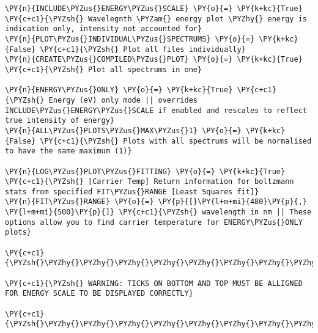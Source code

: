 \begin{tcolorbox}[breakable, size=fbox, boxrule=1pt, pad at break*=1mm,colback=cellbackground, colframe=cellborder]
\begin{Verbatim}[commandchars=\\\{\}]
\PY{n}{INCLUDE\PYZus{}ENERGY\PYZus{}SCALE} \PY{o}{=} \PY{k+kc}{True} \PY{c+c1}{\PYZsh{} Wavelegnth \PYZam{} energy plot \PYZhy{} energy is indication only, intensity not accounted for}
\PY{n}{PLOT\PYZus{}INDIVIDUAL\PYZus{}SPECTRUMS} \PY{o}{=} \PY{k+kc}{False} \PY{c+c1}{\PYZsh{} Plot all files individually}
\PY{n}{CREATE\PYZus{}COMPILED\PYZus{}PLOT} \PY{o}{=} \PY{k+kc}{True} \PY{c+c1}{\PYZsh{} Plot all spectrums in one}

\PY{n}{ENERGY\PYZus{}ONLY} \PY{o}{=} \PY{k+kc}{True} \PY{c+c1}{\PYZsh{} Energy (eV) only mode || overrides INCLUDE\PYZus{}ENERGY\PYZus{}SCALE if enabled and rescales to reflect true intensity of energy}
\PY{n}{ALL\PYZus{}PLOTS\PYZus{}MAX\PYZus{}1} \PY{o}{=} \PY{k+kc}{False} \PY{c+c1}{\PYZsh{} Plots with all spectrums will be normalised to have the same maximum (1)}

\PY{n}{LOG\PYZus{}PLOT\PYZus{}FITTING} \PY{o}{=} \PY{k+kc}{True} \PY{c+c1}{\PYZsh{} [Carrier Temp] Return information for boltzmann stats from specified FIT\PYZus{}RANGE [Least Squares fit]}
\PY{n}{FIT\PYZus{}RANGE} \PY{o}{=} \PY{p}{[}\PY{l+m+mi}{480}\PY{p}{,} \PY{l+m+mi}{500}\PY{p}{]} \PY{c+c1}{\PYZsh{} wavelength in nm || These options allow you to find carrier temperature for ENERGY\PYZus{}ONLY plots}

\PY{c+c1}{\PYZsh{}\PYZhy{}\PYZhy{}\PYZhy{}\PYZhy{}\PYZhy{}\PYZhy{}\PYZhy{}\PYZhy{}\PYZhy{}\PYZhy{}\PYZhy{}\PYZhy{}\PYZhy{}\PYZhy{}\PYZhy{}\PYZhy{}\PYZhy{}\PYZhy{}\PYZhy{}\PYZhy{}\PYZhy{}\PYZhy{}\PYZhy{}\PYZhy{}\PYZhy{}\PYZhy{}\PYZhy{}\PYZhy{}\PYZhy{}\PYZhy{}\PYZhy{}\PYZhy{}\PYZhy{}\PYZhy{}\PYZhy{}\PYZhy{}\PYZhy{}\PYZhy{}\PYZhy{}\PYZhy{}\PYZhy{}\PYZhy{}\PYZhy{}\PYZhy{}\PYZhy{}\PYZhy{}\PYZhy{}\PYZhy{}\PYZhy{}\PYZhy{}\PYZhy{}\PYZhy{}\PYZhy{}\PYZhy{}\PYZhy{}\PYZhy{}\PYZhy{}\PYZhy{}\PYZhy{}\PYZhy{}\PYZhy{}\PYZhy{}\PYZhy{}\PYZhy{}\PYZhy{}\PYZhy{}\PYZhy{}\PYZhy{}\PYZhy{}\PYZhy{}\PYZhy{}\PYZhy{}\PYZhy{}\PYZhy{}\PYZhy{}\PYZhy{}\PYZhy{}\PYZsh{}}

\PY{c+c1}{\PYZsh{} WARNING: TICKS ON BOTTOM AND TOP MUST BE ALLIGNED FOR ENERGY SCALE TO BE DISPLAYED CORRECTLY}

\PY{c+c1}{\PYZsh{}\PYZhy{}\PYZhy{}\PYZhy{}\PYZhy{}\PYZhy{}\PYZhy{}\PYZhy{}\PYZhy{}\PYZhy{}\PYZhy{}\PYZhy{}\PYZhy{}\PYZhy{}\PYZhy{}\PYZhy{}\PYZhy{}\PYZhy{}\PYZhy{}\PYZhy{}\PYZhy{}\PYZhy{}\PYZhy{}\PYZhy{}\PYZhy{}\PYZhy{}\PYZhy{}\PYZhy{}\PYZhy{}\PYZhy{}\PYZhy{}\PYZhy{}\PYZhy{}\PYZhy{}\PYZhy{}\PYZhy{}\PYZhy{}\PYZhy{}\PYZhy{}\PYZhy{}\PYZhy{}\PYZhy{}\PYZhy{}\PYZhy{}\PYZhy{}\PYZhy{}\PYZhy{}\PYZhy{}\PYZhy{}\PYZhy{}\PYZhy{}\PYZhy{}\PYZhy{}\PYZhy{}\PYZhy{}\PYZhy{}\PYZhy{}\PYZhy{}\PYZhy{}\PYZhy{}\PYZhy{}\PYZhy{}\PYZhy{}\PYZhy{}\PYZhy{}\PYZhy{}\PYZhy{}\PYZhy{}\PYZhy{}\PYZhy{}\PYZhy{}\PYZhy{}\PYZhy{}\PYZhy{}\PYZhy{}\PYZhy{}\PYZhy{}\PYZhy{}\PYZsh{}}


\end{Verbatim}
\end{tcolorbox}

